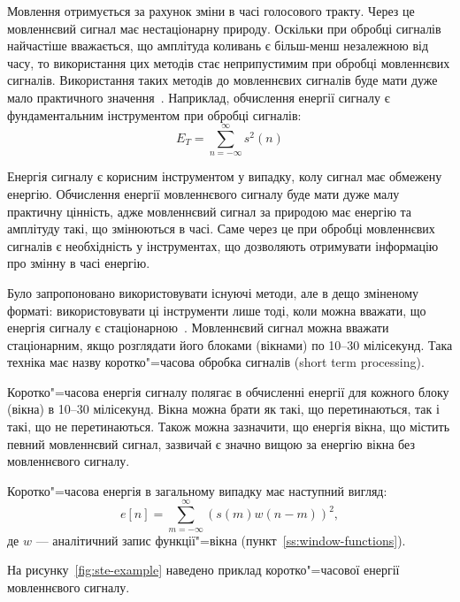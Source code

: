     Мовлення отримується за рахунок зміни в часі голосового тракту.
    Через це мовленнєвий сигнал має нестаціонарну природу.
    Оскільки при обробці сигналів найчастіше вважається, що амплітуда коливань є більш-менш незалежною від часу, то
    використання цих методів стає неприпустимим при обробці мовленнєвих сигналів.
    Використання таких методів до мовленнєвих сигналів буде мати дуже мало практичного значення~\cite{book8}.
    Наприклад, обчислення енергії сигналу є фундаментальним інструментом при обробці сигналів:
    \begin{equation}
        E_T = \sum\limits_{n = {-\infty}}^\infty{s^2\left(n\right)}
    \end{equation}

    Енергія сигналу є корисним інструментом у випадку, колу сигнал має обмежену енергію.
    Обчислення енергії мовленнєвого сигналу буде мати дуже малу практичну цінність, адже мовленнєвий сигнал за
    природою має енергію та амплітуду такі, що змінюються в часі.
    Саме через це при обробці мовленнєвих сигналів є необхідність у інструментах, що дозволяють отримувати інформацію
    про змінну в часі енергію.

    Було запропоновано використовувати існуючі методи, але в дещо зміненому форматі: використовувати ці інструменти
    лише тоді, коли можна вважати, що енергія сигналу є стаціонарною~\cite{book9}.
    Мовленнєвий сигнал можна вважати стаціонарним, якщо розглядати його блоками (вікнами) по 10--30 мілісекунд.
    Така техніка має назву коротко"=часова обробка сигналів (short term processing).

    Коротко"=часова енергія сигналу полягає в обчисленні енергії для кожного блоку (вікна) в 10--30 мілісекунд.
    Вікна можна брати як такі, що перетинаються, так і такі, що не перетинаються.
    Також можна зазначити, що енергія вікна, що містить певний мовленнєвий сигнал, зазвичай є значно вищою за енергію
    вікна без мовленнєвого сигналу.

    Коротко"=часова енергія в загальному випадку має наступний вигляд:
    \begin{equation}
        e[ n ] = \sum\limits_{m=-\infty}^\infty\left(s\left(m\right) w\left(n - m\right)\right)^2,
    \end{equation}
    де $w$ --- аналітичний запис функції"=вікна (пункт~\ref{ss:window-functions}).

    На рисунку~\ref{fig:ste-example} наведено приклад коротко"=часової енергії мовленнєвого сигналу.

